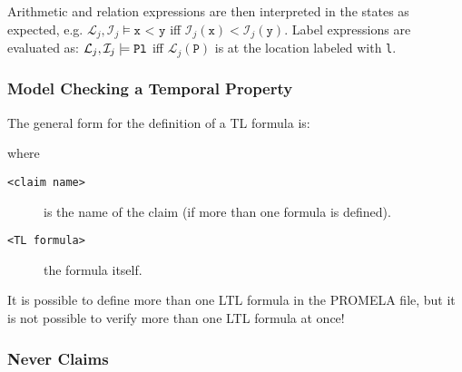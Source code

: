 					Arithmetic and relation expressions are then interpreted in the states as expected, e.g. \( \mathcal{L}_j, \mathcal{I}_j \models \texttt{x < y} \) iff \( \mathcal{I}_j(\texttt{x}) < \mathcal{I}_j(\texttt{y}) \). Label expressions are evaluated as: \( \mathcal{L}_j, \mathcal{I}_j \models \texttt{P\@l} \) iff \( \mathcal{L}_j(\texttt{P}) \) is at the location labeled with \texttt{l}.

			\subsubsection{Model Checking a Temporal Property}
				\label{sec:temporalProp}

				The general form for the definition of a TL formula is:
				\begin{center}
				\end{center}
				where
				\begin{description}
					\item[\texttt{<claim name>}] is the name of the claim (if more than one formula is defined).
					\item[\texttt{<TL formula>}] the formula itself.
				\end{description}

				It is possible to define more than one LTL formula in the PROMELA file, but it is not possible to verify more than one LTL formula at once!

			\subsubsection{Never Claims}
				\label{sec:neverclaim}

